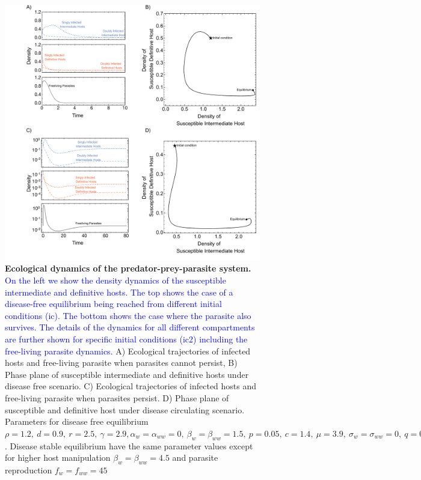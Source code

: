 \documentclass[a4paper]{scrartcl}
\newcommand{\cha}[1]{\textcolor{blue}{#1}}
\begin{document}
\begin{figure}[!ht]
\captionsetup{format=plain}
\includegraphics[width=\textwidth]{Figures/ecotraject_nonlinear.pdf}
\caption{\textbf{Ecological dynamics of the predator-prey-parasite system.} 
\cha{On the left we show the density dynamics of the susceptible intermediate and definitive hosts. The top shows the case of a disease-free equilibrium being reached from different initial conditions (ic). The bottom shows the case where the parasite also survives.
The details of the dynamics for all different compartments are further shown for specific initial conditions (ic2) including the free-living parasite dynamics.
}
A) Ecological trajectories of infected hosts and free-living parasite when parasites cannot persist, B) Phase plane of susceptible intermediate and definitive hosts under disease free scenario. C) Ecological trajectories of infected hosts and free-living parasite when parasites persist. D) Phase plane of susceptible and definitive host under disease circulating scenario. Parameters for disease free equilibrium $\rho =  1.2, \ d = 0.9, \  r = 2.5, \ \gamma =  2.9, \alpha_w = \alpha_{ww} =  0, \ \beta_w = \beta_{ww} = 1.5, \ p = 0.05, \  c = 1.4, \ \mu = 3.9, \ \sigma_w = \sigma_{ww} = 0, \ q = 0.05, \ f_w = f_{ww} = 7.5, \ \delta = 0.9, \ k = 0.26, \ h = 0.6$. Disease stable equilibrium have the same parameter values except for higher host manipulation $ \beta_w =  \beta_{ww} = 4.5$ and parasite reproduction $ f_w  = f_{ww} = 45$}
\label{fig:ecotraject:nonlinear}
\end{figure}
\end{document}
